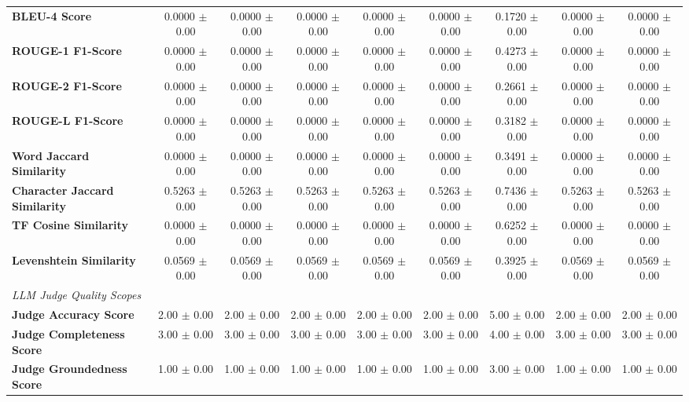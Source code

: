 \begin{table}[t]
\begin{tabular}{lcccccccc}
\textbf{BLEU-4 Score} & 0.0000 $\pm$ 0.00 & 0.0000 $\pm$ 0.00 & 0.0000 $\pm$ 0.00 & 0.0000 $\pm$ 0.00 & 0.0000 $\pm$ 0.00 & 0.1720 $\pm$ 0.00 & 0.0000 $\pm$ 0.00 & 0.0000 $\pm$ 0.00 \\
\textbf{ROUGE-1 F1-Score} & 0.0000 $\pm$ 0.00 & 0.0000 $\pm$ 0.00 & 0.0000 $\pm$ 0.00 & 0.0000 $\pm$ 0.00 & 0.0000 $\pm$ 0.00 & 0.4273 $\pm$ 0.00 & 0.0000 $\pm$ 0.00 & 0.0000 $\pm$ 0.00 \\
\textbf{ROUGE-2 F1-Score} & 0.0000 $\pm$ 0.00 & 0.0000 $\pm$ 0.00 & 0.0000 $\pm$ 0.00 & 0.0000 $\pm$ 0.00 & 0.0000 $\pm$ 0.00 & 0.2661 $\pm$ 0.00 & 0.0000 $\pm$ 0.00 & 0.0000 $\pm$ 0.00 \\
\textbf{ROUGE-L F1-Score} & 0.0000 $\pm$ 0.00 & 0.0000 $\pm$ 0.00 & 0.0000 $\pm$ 0.00 & 0.0000 $\pm$ 0.00 & 0.0000 $\pm$ 0.00 & 0.3182 $\pm$ 0.00 & 0.0000 $\pm$ 0.00 & 0.0000 $\pm$ 0.00 \\
\textbf{Word Jaccard Similarity} & 0.0000 $\pm$ 0.00 & 0.0000 $\pm$ 0.00 & 0.0000 $\pm$ 0.00 & 0.0000 $\pm$ 0.00 & 0.0000 $\pm$ 0.00 & 0.3491 $\pm$ 0.00 & 0.0000 $\pm$ 0.00 & 0.0000 $\pm$ 0.00 \\
\textbf{Character Jaccard Similarity} & 0.5263 $\pm$ 0.00 & 0.5263 $\pm$ 0.00 & 0.5263 $\pm$ 0.00 & 0.5263 $\pm$ 0.00 & 0.5263 $\pm$ 0.00 & 0.7436 $\pm$ 0.00 & 0.5263 $\pm$ 0.00 & 0.5263 $\pm$ 0.00 \\
\textbf{TF Cosine Similarity} & 0.0000 $\pm$ 0.00 & 0.0000 $\pm$ 0.00 & 0.0000 $\pm$ 0.00 & 0.0000 $\pm$ 0.00 & 0.0000 $\pm$ 0.00 & 0.6252 $\pm$ 0.00 & 0.0000 $\pm$ 0.00 & 0.0000 $\pm$ 0.00 \\
\textbf{Levenshtein Similarity} & 0.0569 $\pm$ 0.00 & 0.0569 $\pm$ 0.00 & 0.0569 $\pm$ 0.00 & 0.0569 $\pm$ 0.00 & 0.0569 $\pm$ 0.00 & 0.3925 $\pm$ 0.00 & 0.0569 $\pm$ 0.00 & 0.0569 $\pm$ 0.00 \\
\midrule
\multicolumn{9}{l}{\textit{LLM Judge Quality Scopes}} \\
\textbf{Judge Accuracy Score} & 2.00 $\pm$ 0.00 & 2.00 $\pm$ 0.00 & 2.00 $\pm$ 0.00 & 2.00 $\pm$ 0.00 & 2.00 $\pm$ 0.00 & 5.00 $\pm$ 0.00 & 2.00 $\pm$ 0.00 & 2.00 $\pm$ 0.00 \\
\textbf{Judge Completeness Score} & 3.00 $\pm$ 0.00 & 3.00 $\pm$ 0.00 & 3.00 $\pm$ 0.00 & 3.00 $\pm$ 0.00 & 3.00 $\pm$ 0.00 & 4.00 $\pm$ 0.00 & 3.00 $\pm$ 0.00 & 3.00 $\pm$ 0.00 \\
\textbf{Judge Groundedness Score} & 1.00 $\pm$ 0.00 & 1.00 $\pm$ 0.00 & 1.00 $\pm$ 0.00 & 1.00 $\pm$ 0.00 & 1.00 $\pm$ 0.00 & 3.00 $\pm$ 0.00 & 1.00 $\pm$ 0.00 & 1.00 $\pm$ 0.00 \\

\end{tabular}
\end{table}
